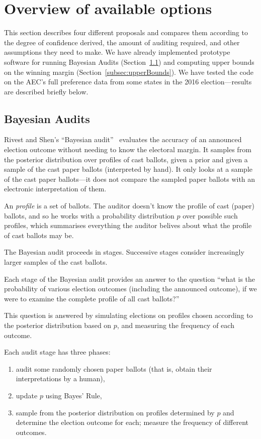 \documentclass[10pt,a4paper]{article}
\begin{document}
\section{Overview of available options}
This section describes four different proposals and compares them according to the degree of confidence derived, the amount of auditing required, and other assumptions they need to make.  We have already implemented prototype software for running Bayesian Audits (Section~\ref{subsec:ShortBayesianAudits}) and computing upper bounds on the winning margin (Section~\ref{subsec:upperBounds}).  We have tested the code on the AEC's full preference data from some states in the 2016 election---results are described briefly below.  

\subsection{Bayesian Audits} \label{subsec:ShortBayesianAudits}
Rivest and Shen's ``Bayesian audit''~\cite{rivest2012bayesian} evaluates the accuracy of an announced
election outcome without needing to know the electoral margin.  It samples from the posterior distribution over
profiles of cast ballots, given a prior and given a sample of the
cast paper ballots (interpreted by hand).  It only looks at a
sample of the cast paper ballots---it does not compare the sampled
paper ballots with an electronic interpretation of them.

An \emph{profile} is a set of ballots.  The auditor doesn't know the
profile of cast (paper) ballots, and so he works with a probability
distribution $p$ over possible such profiles, which summarises everything
the auditor belives about what the profile of cast ballots may be.

The Bayesian audit proceeds in stages.  Successive stages consider
increasingly larger samples of the cast ballots.

Each stage of the Bayesian audit provides an answer to the question
``what is the probability
of various election outcomes (including the announced outcome),
if we were to examine the complete profile of all cast ballots?''

This question is answered by simulating elections on profiles chosen
according to the posterior distribution based on $p$, and
measuring the frequency of each outcome.

 Each audit stage has three phases:
\begin{enumerate}
\item audit some randomly chosen paper ballots
      (that is, obtain their interpretations by a human),
\item update $p$ using Bayes' Rule,
\item sample from the posterior distribution on profiles determined by $p$
  and determine the election outcome for each;
  measure the frequency of different outcomes.
\end{enumerate}
\end{document}
